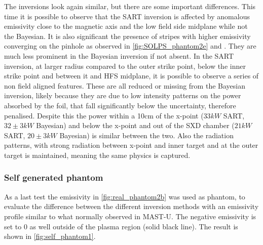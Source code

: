 The inversions look again similar, but there are some important differences. This time it is possible to observe that the SART inversion is affected by anomalous emissivity close to the magnetic axis and the low field side midplane while not the Bayesian. It is also significant the presence of stripes with higher emissivity converging on the pinhole as observed in \autoref{fig:SOLPS_phantom2e} and . They are much less prominent in the Bayesian inversion if not absent. In the SART inversion, at larger radius compared to the outer strike point, below the inner strike point and between it and HFS midplane, it is possible to observe a series of non field aligned features. These are all reduced or missing from the Bayesian inversion, likely because they are due to low intensity patterns on the power absorbed by the foil, that fall significantly below the uncertainty, therefore penalised. Despite this the power within a 10cm of the x-point ($33kW$ SART, $32\pm3kW$ Bayesian) and below the x-point and out of the SXD chamber ($21kW$ SART, $20\pm3kW$ Bayesian) is similar between the two. Also the radiation patterns, with strong radiation between x-point and inner target and at the outer target is maintained, meaning the same physics is captured.

\subsubsection{Self generated phantom}

As a last test the emissivity in \autoref{fig:real_phantom2b} was used as phantom, to evaluate the difference between the different inversion methods with an emissivity profile similar to what normally observed in MAST-U. The negative emissivity is set to 0 as well outside of the plasma region (solid black line). The result is shown in \autoref{fig:self_phantom1}.

